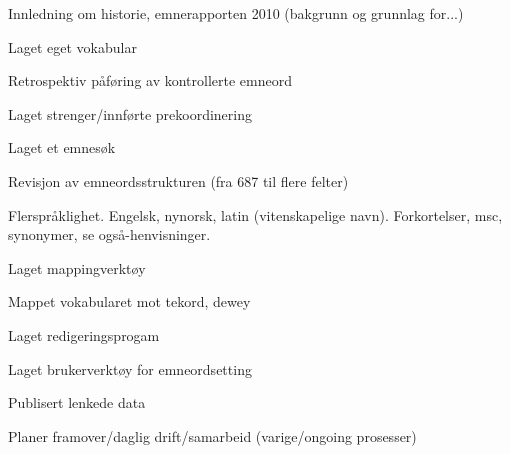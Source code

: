 Innledning om historie, emnerapporten 2010 (bakgrunn og grunnlag for...)

Laget eget vokabular

Retrospektiv påføring av kontrollerte emneord

Laget strenger/innførte prekoordinering

Laget et emnesøk 

Revisjon av emneordsstrukturen (fra 687 til flere felter)

Flerspråklighet. Engelsk, nynorsk, latin (vitenskapelige navn). Forkortelser, msc, 
synonymer, se også-henvisninger. 

Laget mappingverktøy

Mappet vokabularet mot tekord, dewey

Laget redigeringsprogam 

Laget brukerverktøy for emneordsetting

Publisert lenkede data

Planer framover/daglig drift/samarbeid (varige/ongoing prosesser)
